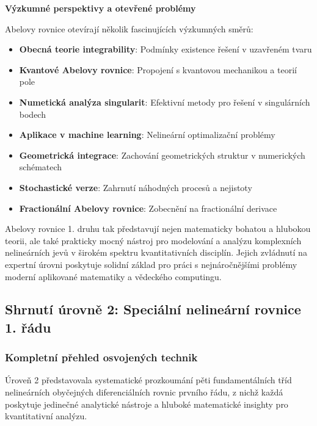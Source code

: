 \vspace{1\baselineskip}

\noindent\textbf{Výzkumné perspektivy a otevřené problémy}

Abelovy rovnice otevírají několik fascinujících výzkumných směrů:
\begin{itemize}
\item \textbf{Obecná teorie integrability}: Podmínky existence řešení v uzavřeném tvaru
\item \textbf{Kvantové Abelovy rovnice}: Propojení s kvantovou mechanikou a teorií pole
\item \textbf{Numetická analýza singularit}: Efektivní metody pro řešení v singulárních bodech
\item \textbf{Aplikace v machine learning}: Nelineární optimalizační problémy
\item \textbf{Geometrická integrace}: Zachování geometrických struktur v numerických schématech
\item \textbf{Stochastické verze}: Zahrnutí náhodných procesů a nejistoty
\item \textbf{Fractionální Abelovy rovnice}: Zobecnění na fractionální derivace
\end{itemize}

Abelovy rovnice 1. druhu tak představují nejen matematicky bohatou a hlubokou teorii, ale také prakticky mocný nástroj pro modelování a analýzu komplexních nelineárních jevů v širokém spektru kvantitativních disciplín. Jejich zvládnutí na expertní úrovni poskytuje solidní základ pro práci s nejnáročnějšími problémy moderní aplikované matematiky a vědeckého computingu.


\subsection{Shrnutí úrovně 2: Speciální nelineární rovnice 1. řádu}
\label{sec:shrnuti-uroven-2}

\subsubsection{Kompletní přehled osvojených technik}
\label{subsec:prehled-technik-uroven2}

Úroveň 2 představovala systematické prozkoumání pěti fundamentálních tříd nelineárních obyčejných diferenciálních rovnic prvního řádu, z nichž každá poskytuje jedinečné analytické nástroje a hluboké matematické insighty pro kvantitativní analýzu.

\vspace{1\baselineskip}

